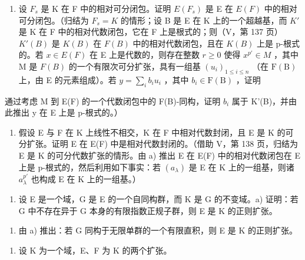 \begin{enumerate}
\def\labelenumi{\alph{enumi})}
\tightlist
\item
  设 \(F_{s}\) 是 K 在 F 中的相对可分闭包。证明 \(E(F_{s})\) 是 E 在 \(E(F)\) 中的相对可分闭包。（归结为 \(F_{s}=K\) 的情形；设 B 是 E 在 K 上的一个超越基，而 \(K'\) 是 K 在 F 中的相对代数闭包，它在 F 上是根式的；则（V，第 137 页）\(K'(B)\) 是 \(K(B)\) 在 \(F(B)\) 中的相对代数闭包，且在 \(K(B)\) 上是 p-根式的。若 \(x\in E(F)\) 在 E 上是代数的，则存在整数 \(r\geqslant0\) 使得 \(x^{p'}\in M\) ，其中 M 是 \(F(B)\) 的一个有限次可分扩张，具有一组基 \((u_{i})_{1\leqslant i\leqslant n}\) （在 \(\mathrm{F(B)}\) 上，由 E 的元素组成）。若 \(y = \sum_{i}b_{i}u_{i}\) ，其中 \(b_{i}\in \mathrm{F(B)}\) ，证明
\end{enumerate}

通过考虑 M 到 E(F) 的一个代数闭包中的 F(B)-同构，证明 \(b_{i}\) 属于 K'(B)，并由此推出 y 在 E 上是 p-根式的。）

\begin{enumerate}
\def\labelenumi{\alph{enumi})}
\setcounter{enumi}{1}
\tightlist
\item
  假设 E 与 F 在 K 上线性不相交，K 在 F 中相对代数封闭，且 E 是 K 的可分扩张。证明 E 在 E(F) 中是相对代数封闭的。（借助 V，第 138 页，归结为 E 是 K 的可分代数扩张的情形。由 a) 推出 E 在 E(F) 中的相对代数闭包在 E 上是 p-根式的，然后利用如下事实：若 \((a_{\lambda})\) 是 E 在 K 上的一组基，则诸 \(a_{\lambda}^{p'}\) 也构成 E 在 K 上的一组基。）
\end{enumerate}

\begin{enumerate}
\def\labelenumi{\arabic{enumi})}
\setcounter{enumi}{2}
\tightlist
\item
  设 E 是一个域，G 是 E 的一个自同构群，而 K 是 G 的不变域。a) 证明：若 G 中不存在异于 G 本身的有限指数正规子群，则 E 是 K 的正则扩张。
\end{enumerate}

\begin{enumerate}
\def\labelenumi{\alph{enumi})}
\setcounter{enumi}{1}
\tightlist
\item
  由 a) 推出：若 G 同构于无限单群的一个有限直积，则 E 是 K 的正则扩张。
\end{enumerate}

\begin{enumerate}
\def\labelenumi{\arabic{enumi})}
\setcounter{enumi}{3}
\tightlist
\item
  设 K 为一个域，E、F 为 K 的两个扩张。
\end{enumerate}

